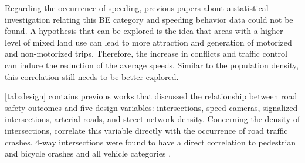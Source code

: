 Regarding the occurrence of speeding, previous papers about a statistical investigation relating this BE category and speeding behavior data could not be found. A hypothesis that can be explored is the idea that areas with a higher level of mixed land use can lead to more attraction and generation of motorized and non-motorized trips. Therefore, the increase in conflicts and traffic control can induce the reduction of the average speeds. Similar to the population density, this correlation still needs to be better explored. 

\autoref{tab:design} contains previous works that discussed the relationship between road safety outcomes and five design variables: intersections, speed cameras, signalized intersections, arterial roads, and street network density. Concerning the density of intersections, \textcite{Dumbaugh2011,Dumbaugh2013,Elvik2009,Huang2018} correlate this variable directly with the occurrence of road traffic crashes. 4-way intersections were found to have a direct correlation to pedestrian and bicycle crashes \cite{Dumbaugh2011, Dumbaugh2013} and all vehicle categories \cite{Huang2018}.


